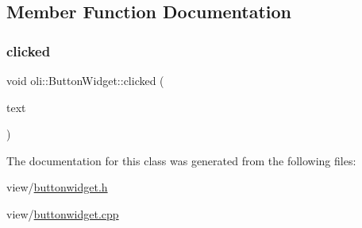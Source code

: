 \subsection{Member Function Documentation}
\hypertarget{classoli_1_1_button_widget_aff1ad492bde8150e865090bf98fd4c68}{}\label{classoli_1_1_button_widget_aff1ad492bde8150e865090bf98fd4c68} 
\subsubsection{\texorpdfstring{clicked}{clicked}}
{\footnotesize\ttfamily void oli\+::\+Button\+Widget\+::clicked (\begin{DoxyParamCaption}\item[{const Q\+String \&}]{text }\end{DoxyParamCaption})\hspace{0.3cm}{\ttfamily [signal]}}



The documentation for this class was generated from the following files\+:\begin{DoxyCompactItemize}
\item 
view/\hyperlink{buttonwidget_8h}{buttonwidget.\+h}\item 
view/\hyperlink{buttonwidget_8cpp}{buttonwidget.\+cpp}\end{DoxyCompactItemize}
